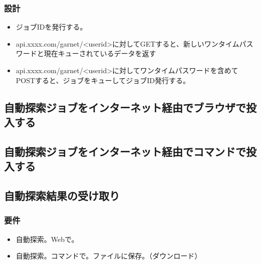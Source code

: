 \documentclass{jsbook}
\begin{document}
\subsubsection{設計}
\begin{itemize}
	\item ジョブIDを発行する。
	\item api.xxxx.com/garnet/<userid>に対してGETすると、新しいワンタイムパスワードと現在キューされているデータを返す
	\item api.xxxx.com/garnet/<userid>に対してワンタイムパスワードを含めてPOSTすると、ジョブをキューしてジョブID発行する。
\end{itemize}

\subsection{自動探索ジョブをインターネット経由でブラウザで投入する}

\subsection{自動探索ジョブをインターネット経由でコマンドで投入する}



\subsection{自動探索結果の受け取り}

\subsubsection{要件}

\begin{itemize}
	\item 自動探索。Webで。
	\item 自動探索。コマンドで。ファイルに保存。（ダウンロード）
\end{itemize}
\end{document}
